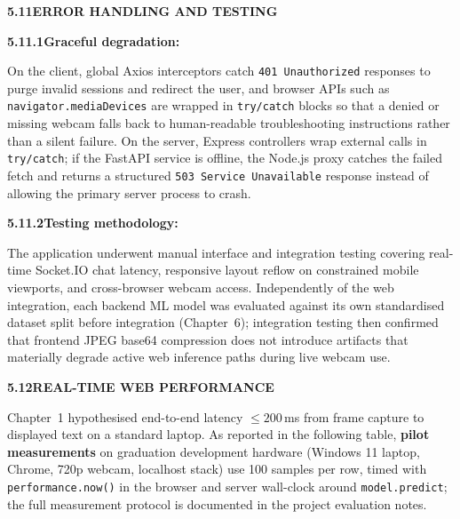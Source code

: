 \noindent\textbf{5.11\quad ERROR HANDLING AND TESTING}\par
{}
\vspace{0.2cm}

\noindent\textbf{5.11.1\quad Graceful degradation:}\par
{}
\vspace{0.2cm}

\noindent On the client, global Axios interceptors catch \texttt{401 Unauthorized} responses to purge invalid sessions and redirect the user, and browser APIs such as \texttt{navigator.mediaDevices} are wrapped in \texttt{try/catch} blocks so that a denied or missing webcam falls back to human-readable troubleshooting instructions rather than a silent failure. On the server, Express controllers wrap external calls in \texttt{try/catch}; if the FastAPI service is offline, the Node.js proxy catches the failed fetch and returns a structured \texttt{503 Service Unavailable} response instead of allowing the primary server process to crash.\par\vspace{0.2cm}

\noindent\textbf{5.11.2\quad Testing methodology:}\par
{}
\vspace{0.2cm}

\noindent The application underwent manual interface and integration testing covering real-time Socket.IO chat latency, responsive layout reflow on constrained mobile viewports, and cross-browser webcam access. Independently of the web integration, each backend ML model was evaluated against its own standardised dataset split before integration (Chapter~6); integration testing then confirmed that frontend JPEG base64 compression does not introduce artifacts that materially degrade active web inference paths during live webcam use.\par\vspace{0.3cm}

\noindent\textbf{5.12\quad REAL-TIME WEB PERFORMANCE}\par
{}
\vspace{0.2cm}

\noindent Chapter~1 hypothesised end-to-end latency $\leq 200$\,ms from frame capture to displayed text on a standard laptop. As reported in the following table, \textbf{pilot measurements} on graduation development hardware (Windows 11 laptop, Chrome, 720p webcam, localhost stack) use 100 samples per row, timed with \texttt{performance.now()} in the browser and server wall-clock around \texttt{model.predict}; the full measurement protocol is documented in the project evaluation notes.\par\vspace{0.2cm}

